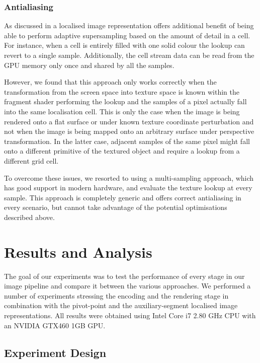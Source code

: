 \documentclass[11pt,a4paper,twoside]{article}
\begin{document}
\subsubsection {Antialiasing}

As discussed in \cite{NehabHoppe08} a localised image representation offers additional benefit of being able to perform adaptive supersampling based on the amount of detail in a cell. For instance, when a cell is entirely filled with one solid colour the lookup can revert to a single sample. Additionally, the cell stream data can be read from the GPU memory only once and shared by all the samples.

However, we found that this approach only works correctly when the transformation from the screen space into texture space is known within the fragment shader performing the lookup and the samples of a pixel actually fall into the same localisation cell. This is only the case when the image is being rendered onto a flat surface or under known texture coordinate perturbation and not when the image is being mapped onto an arbitrary surface under perspective transformation. In the latter case, adjacent samples of the same pixel might fall onto a different primitive of the textured object and require a lookup from a different grid cell.

To overcome these issues, we resorted to using a multi-sampling approach, which has good support in modern hardware, and evaluate the texture lookup at every sample. This approach is completely generic and offers correct antialiasing in every scenario, but cannot take advantage of the potential optimisations described above.

\section {Results and Analysis}

The goal of our experiments was to test the performance of every stage in our image pipeline and compare it between the various approaches. We performed a number of experiments stressing the encoding and the rendering stage in combination with the pivot-point and the auxiliary-segment localised image representations. All results were obtained using Intel Core i7 2.80 GHz CPU with an NVIDIA GTX460 1GB GPU.

\subsection {Experiment Design}
\end{document}

